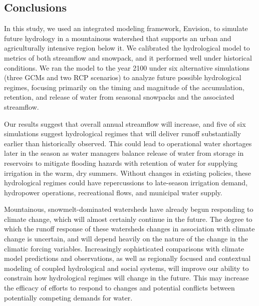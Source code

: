 \documentclass[water,article,submit,moreauthors,pdftex,10pt,a4paper]{mdpi}
\theoremstyle{mdpi}
\newcounter{ex}
\newcounter{re}
\theoremstyle{mdpidefinition}
\begin{document}
\subsection{Conclusions}

In this study, we used an integrated modeling framework, Envision, to simulate future hydrology in a mountainous watershed that supports an urban and agriculturally intensive region below it. We calibrated the hydrological model to metrics of both streamflow and snowpack, and it performed well under historical conditions. We ran the model to the year 2100 under six alternative simulations (three GCMs and two RCP scenarios) to analyze future possible hydrological regimes, focusing primarily on the timing and magnitude of the accumulation, retention, and release of water from seasonal snowpacks and the associated streamflow. 

Our results suggest that overall annual streamflow will increase, and five of six simulations suggest hydrological regimes that will deliver runoff substantially earlier than historically observed. This could lead to operational water shortages later in the season as water managers balance release of water from storage in reservoirs to mitigate flooding hazards with retention of water for supplying irrigation in the warm, dry summers. Without changes in existing policies, these hydrological regimes could have repercussions to late-season irrigation demand, hydropower operations, recreational flows, and municipal water supply. 

Mountainous, snowmelt-dominated watersheds have already begun responding to climate change, which will almost certainly continue in the future. The degree to which the runoff response of these watersheds changes in association with climate change is uncertain, and will depend heavily on the nature of the change in the climatic forcing variables. Increasingly sophisticated comparisons with climate model predictions and observations, as well as regionally focused and contextual modeling of coupled hydrological and social systems, will improve our ability to constrain how hydrological regimes will change in the future. This may increase the efficacy of efforts to respond to changes and potential conflicts between potentially competing demands for water.

\end{document}
